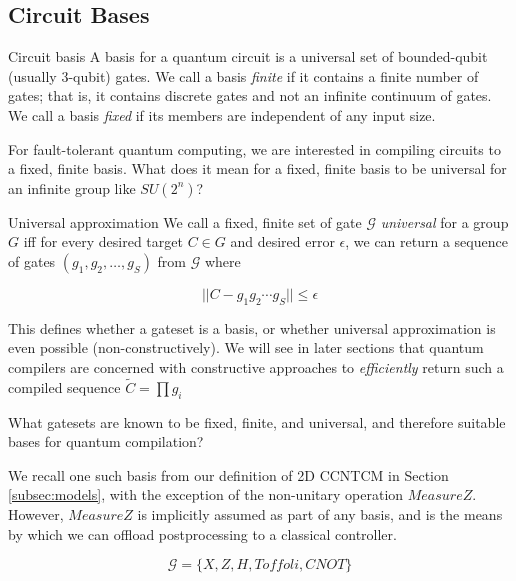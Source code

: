 \subsection{Circuit Bases}
\label{subsec:qcompile-bases}

\begin{definition}{Circuit basis}
A basis for a quantum circuit is a universal set of
bounded-qubit (usually $3$-qubit) gates.
We call a basis \emph{finite} if it contains a finite
number of gates; that is, it contains discrete gates and not an infinite
continuum of gates. We call a basis \emph{fixed} if its members are independent
of any input size.
\end{definition}

For fault-tolerant quantum computing, we are interested in compiling
circuits to a fixed, finite basis. What does it mean for a fixed, finite
basis to be universal for an infinite group like $SU(2^n)$?

\begin{definition}{Universal approximation}
We call a fixed, finite set of gate $\mathcal{G}$ \emph{universal} for
a group $G$ iff for every desired target $C \in G$ and
desired error $\epsilon$, we can return a
sequence of gates $(g_1,g_2,\ldots,g_S)$ from $\mathcal{G}$ where

\begin{equation}
|| C - g_1 g_2 \cdots g_S || \le \epsilon
\end{equation}

\end{definition}

This defines whether a gateset is a basis, or whether universal approximation
is even possible (non-constructively). We will see in later sections that
quantum compilers are concerned with constructive approaches to
\emph{efficiently} return such a compiled sequence $\tilde{C} = \prod g_i$

What gatesets are known to be fixed, finite, and universal, and therefore
suitable bases for quantum compilation?

We recall one such basis from our definition of \textsf{2D CCNTCM} in
Section \ref{subsec:models}, with the exception of the non-unitary operation
$MeasureZ$. However, $MeasureZ$ is implicitly assumed as part of any basis,
and is the means by which we can offload postprocessing to a classical
controller.

\begin{equation}
\mathcal{G} = \{X, Z, H, Toffoli, CNOT\}
\end{equation}

